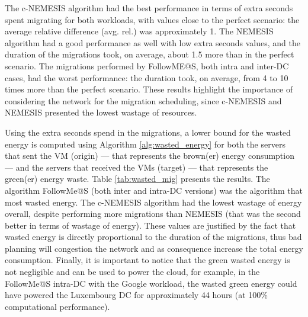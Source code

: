 The c-NEMESIS algorithm had the best performance in terms of extra seconds spent migrating for both workloads, with values close to the perfect scenario: the average relative difference (avg. rel.) was approximately 1. The NEMESIS algorithm had a good performance as well with low extra seconds values, and the duration of the migrations took, on average, about 1.5 more than in the perfect scenario. The migrations performed by FollowME@S, both intra and inter-DC cases, had the worst performance: the duration took, on average, from 4 to 10 times more than the perfect scenario. These results highlight the importance of considering the network for the migration scheduling, since c-NEMESIS and NEMESIS presented the lowest wastage of resources.
                      

Using the extra seconds spend in the migrations, a lower bound for the wasted energy is computed using Algorithm \ref{alg:wasted_energy} for both the servers that sent the VM (origin) --- that represents the brown(er) energy consumption --- and the servers that received the VMs (target) --- that represents the green(er) energy waste. Table \ref{tab:wasted_mig} presents the results. The algorithm FollowMe@S (both inter and intra-DC versions) was the algorithm that most wasted energy. The c-NEMESIS algorithm had the lowest wastage of energy overall, despite performing more migrations than NEMESIS (that was the second better in terms of wastage of energy). These values are justified by the fact that wasted energy is directly proportional to the duration of the migrations, thus bad planning will congestion the network and as consequence increase the total energy consumption. Finally, it is important to notice that the green wasted energy is not negligible and can be used to power the cloud, for example, in the FollowMe@S intra-DC with the Google workload, the wasted green energy could have powered the Luxembourg DC for approximately 44 hours (at 100\% computational performance).



